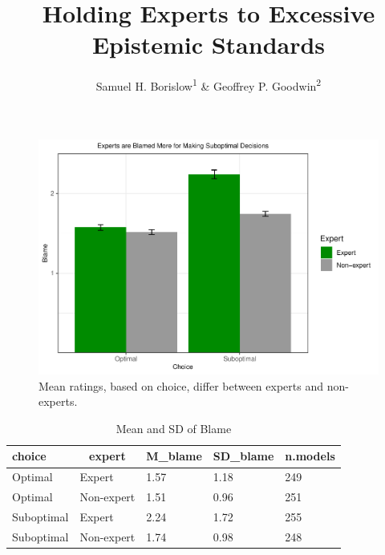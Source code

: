 \documentclass[
  man,floatsintext]{apa6}
\title{Holding Experts to Excessive Epistemic Standards}
\author{Samuel H. Borislow\textsuperscript{1} \& Geoffrey P. Goodwin\textsuperscript{2}}
\date{}
\affiliation{\vspace{0.5cm}\textsuperscript{1} University of Chicago\\\textsuperscript{2} University of Pennsylvania}
\begin{document}
\maketitle



\begin{figure}
\centering
\includegraphics{2-21_pre-class_ScientificReportManuscriptDraft3_files/figure-latex/fig-plot-1-1.pdf}
\caption{\label{fig:fig-plot-1}Mean ratings, based on choice, differ between experts and non-experts.}
\end{figure}

\begin{table}[tbp]

\begin{center}
\begin{threeparttable}

\caption{\label{tab:table-table1}Mean and SD of Blame}

\begin{tabular}{lllll}
\toprule
choice & \multicolumn{1}{c}{expert} & \multicolumn{1}{c}{M\_blame} & \multicolumn{1}{c}{SD\_blame} & \multicolumn{1}{c}{n.models}\\
\midrule
Optimal & Expert & 1.57 & 1.18 & 249\\
Optimal & Non-expert & 1.51 & 0.96 & 251\\
Suboptimal & Expert & 2.24 & 1.72 & 255\\
Suboptimal & Non-expert & 1.74 & 0.98 & 248\\
\bottomrule
\end{tabular}

\end{threeparttable}
\end{center}

\end{table}
\end{document}

